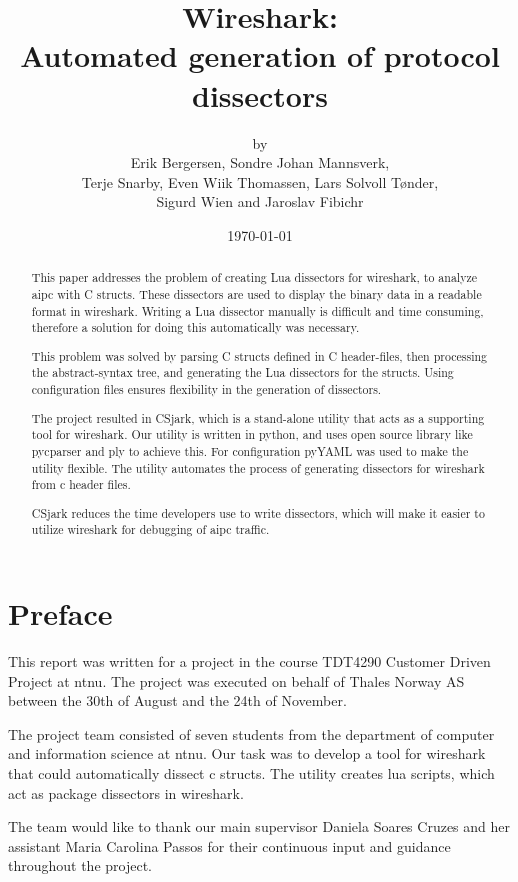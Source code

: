 \documentclass[a4paper, 11pt, twoside]{report}
\title{Wireshark:\\ Automated generation of protocol dissectors}
\author{by\\ Erik Bergersen, Sondre Johan Mannsverk,\\ Terje Snarby,
		Even Wiik Thomassen, Lars Solvoll Tønder,\\ Sigurd Wien
		and Jaroslav Fibichr}
\date{\today}
\begin{document}


\begin{abstract}
This paper addresses the problem of creating Lua dissectors for \Gls{wireshark}, 
to analyze \gls{aipc} with C structs. These dissectors are used to display the 
binary data in a readable format in \Gls{wireshark}. Writing a Lua dissector 
manually is difficult and time consuming, therefore a solution for doing this 
automatically was necessary.  

This problem was solved by parsing C structs defined in C header-files, then 
processing the abstract-syntax tree, and generating the Lua dissectors 
for the structs. Using configuration files ensures flexibility in the generation of 
dissectors.

The project resulted in CSjark, which is a stand-alone \gls{utility} that acts 
as a supporting tool for \Gls{wireshark}. Our \gls{utility} is written in 
\Gls{python}, and uses open source {library} like \gls{pycparser} and 
\gls{ply} to achieve this. For configuration pyYAML was used to make the 
utility flexible. The \gls{utility} automates the process of generating 
\glspl{dissector} for \Gls{wireshark} from \Gls{c} \gls{header} files. 

CSjark reduces the time developers use to write dissectors, which 
will make it easier to utilize \Gls{wireshark} for debugging of  \gls{aipc} 
traffic.
\end{abstract}

\chapter*{Preface}
This report was written for a project in the course TDT4290 Customer Driven
Project at \Gls{ntnu}. The project
was executed on behalf of Thales Norway AS between the 30th of August and the
24th of November.

The project team consisted of seven students from the department of computer
and information science at \Gls{ntnu}. Our task was to develop a tool for \Gls{wireshark}
that could automatically dissect \Gls{c} \glspl{struct}. The \gls{utility} creates \Gls{lua} \glspl{script},
which act as package \glspl{dissector} in \Gls{wireshark}. 

The team would like to thank our main supervisor Daniela Soares Cruzes
and her assistant Maria Carolina Passos for their continuous input and
guidance throughout the project.
\end{document}
